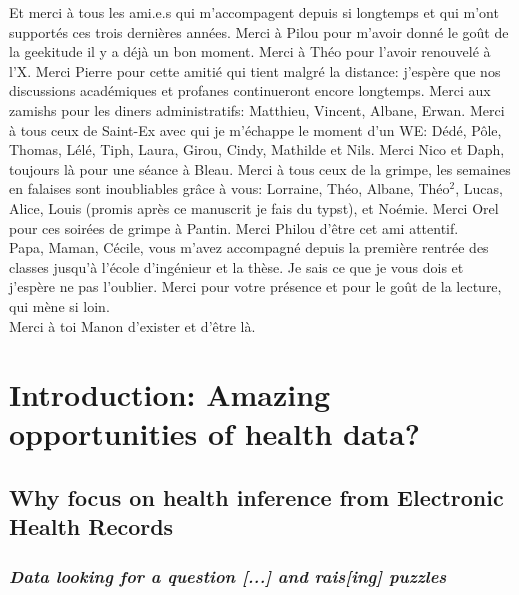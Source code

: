 \documentclass[french,12pt,twoside,a4paper]{book}
\begin{document}
Et merci à tous les ami.e.s qui m'accompagent depuis si longtemps et qui m'ont
supportés ces trois dernières années. Merci à Pilou pour m'avoir donné le goût
de la geekitude il y a déjà un bon moment. Merci à Théo pour l'avoir renouvelé à
l'X. Merci Pierre pour cette amitié qui tient malgré la distance: j'espère que
nos discussions académiques et profanes continueront encore longtemps. Merci aux
zamishs pour les diners administratifs: Matthieu, Vincent, Albane, Erwan. Merci
à tous ceux de Saint-Ex avec qui je m'échappe le moment d'un WE: Dédé, Pôle,
Thomas, Lélé, Tiph, Laura, Girou, Cindy, Mathilde et Nils. Merci Nico et Daph,
toujours là pour une séance à Bleau. Merci à tous ceux de la grimpe, les
semaines en falaises sont inoubliables grâce à vous: Lorraine, Théo, Albane,
Théo$^2$, Lucas, Alice, Louis (promis après ce manuscrit je fais du typst), et
Noémie. Merci Orel pour ces soirées de grimpe à Pantin. Merci Philou d'être cet
ami attentif.\\

Papa, Maman, Cécile, vous m'avez accompagné depuis la première rentrée des
classes jusqu'à l'école d'ingénieur et la thèse. Je sais ce que je vous dois et
j'espère ne pas l'oublier. Merci pour votre présence et pour le goût de la
lecture, qui mène si loin. \\

Merci à toi Manon d'exister et d'être là.

\pagestyle{basic}%

\newpage
\dominitoc
\tableofcontents

\mainmatter

\chapter{Introduction: Amazing opportunities of health data?}\label{chapter:intro}

\minitoc
\section{Why focus on health inference from Electronic Health Records}\label{sec:intro:landscape}


\subsection{\textit{Data looking for a question [...] and rais[ing] puzzles} \citep{cox2001statistical}}%
\label{subsec:intro:wrapup}%
\end{document}
